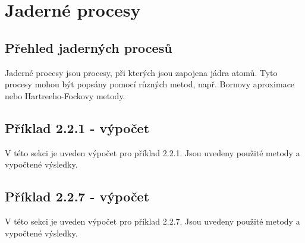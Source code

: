 \section{Jaderné procesy}

\subsection{Přehled jaderných procesů}

Jaderné procesy jsou procesy, při kterých jsou zapojena jádra atomů. Tyto procesy mohou být popsány pomocí různých metod, např. Bornovy aproximace nebo Hartreeho-Fockovy metody.

\subsection{Příklad 2.2.1 - výpočet}
\begin{zadani}

\end{zadani}


V této sekci je uveden výpočet pro příklad 2.2.1. Jsou uvedeny použité metody a vypočtené výsledky.

\subsection{Příklad 2.2.7 - výpočet}
\begin{zadani}

\end{zadani}


V této sekci je uveden výpočet pro příklad 2.2.7. Jsou uvedeny použité metody a vypočtené výsledky.


